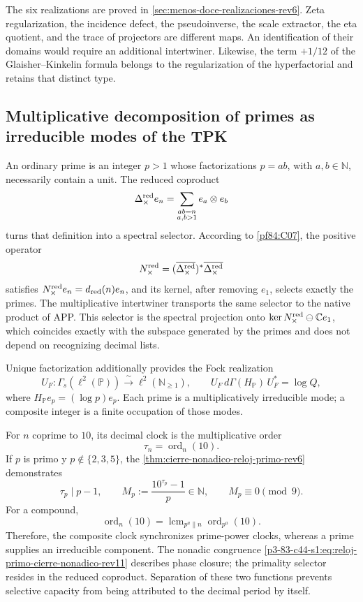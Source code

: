 The six realizations are proved in
\cref{sec:menos-doce-realizaciones-rev6}. Zeta regularization, the incidence defect,
the pseudoinverse, the scale extractor, the eta quotient, and the
trace of projectors are different maps. An identification of their
domains would require an additional intertwiner. Likewise, the term
\(+1/12\) of the Glaisher--Kinkelin formula belongs to the regularization
of the hyperfactorial and retains that distinct type.

\subsection{Multiplicative decomposition of primes as irreducible modes of the TPK}

An ordinary prime is an integer \(p>1\) whose factorizations
\(p=ab\), with \(a,b\in\mathbb N\), necessarily contain a unit. The
reduced coproduct
\[
 \Delta_{\times}^{\rm red}e_n
 =\sum_{\substack{ab=n\\a,b>1}}e_a\otimes e_b
\]
turns that definition into a spectral selector. According to
\cref{pf84:C07}, the positive operator
\[
 N_{\times}^{\rm red}
 =(\overline{\Delta_{\times}^{\rm red}})^*
   \overline{\Delta_{\times}^{\rm red}}
\]
satisfies \(N_{\times}^{\rm red}e_n=d_{\rm red}(n)e_n\), and its kernel, after removing \(e_1\), selects exactly the primes. The multiplicative intertwiner transports the same selector to the native product of APP\@. This selector is the spectral projection onto \(\ker N_{\times}^{\rm red}\ominus\mathbb C e_1\), which coincides exactly with the subspace generated by the primes and does not depend on recognizing decimal lists.

Unique factorization additionally provides the Fock realization
\[
 U_F:\Gamma_s(\ell^2(\mathbb P))
 \xrightarrow{\ \sim\ }\ell^2(\mathbb N_{\geq1}),
 \qquad
 U_F\,d\Gamma(H_{\mathbb P})\,U_F^*=\log Q,
\]
where \(H_{\mathbb P}e_p=(\log p)e_p\). Each prime is a
multiplicatively irreducible mode; a composite integer is a finite occupation
of those modes.

For \(n\) coprime to \(10\), its decimal clock is the multiplicative order
\[
 \tau_n=\operatorname{ord}_n(10).
\]
If \(p\) is primo y \(p\notin\{2,3,5\}\), the
\cref{thm:cierre-nonadico-reloj-primo-rev6} demonstrates
\begin{equation}
 \tau_p\mid p-1,
 \qquad
 M_p:=\frac{10^{\tau_p}-1}{p}\in\mathbb N,
 \qquad
 M_p\equiv0\pmod9.
 \label{p3-83-c44-s1:eq:reloj-primo-cierre-nonadico-rev11}
\end{equation}
For a compound,
\[
 \operatorname{ord}_{n}(10)
 =\operatorname{lcm}_{p^a\parallel n}\operatorname{ord}_{p^a}(10).
\]
Therefore, the composite clock synchronizes prime-power clocks, whereas a prime supplies an irreducible component. The nonadic congruence \eqref{p3-83-c44-s1:eq:reloj-primo-cierre-nonadico-rev11} describes phase closure; the primality selector resides in the reduced coproduct. Separation of these two functions prevents selective capacity from being attributed to the decimal period by itself.

